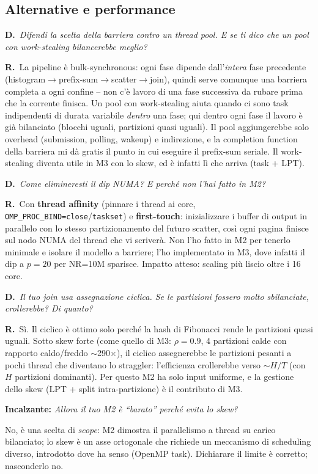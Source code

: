 \documentclass[11pt,a4paper]{article}
\newcommand{\D}[1]{\begin{dom}\small\textbf{D.}\ \itshape #1\end{dom}}
\newcommand{\R}{\noindent\textbf{R.}\ }
\newcommand{\Inc}[1]{\par\smallskip\noindent\textbf{\textcolor{red!55!black}{Incalzante:}} \textit{#1}\ \par}
\begin{document}
\subsection{Alternative e performance}

\D{Difendi la scelta della barriera contro un thread pool. E se ti dico che un pool con work-stealing bilancerebbe meglio?}
\R La pipeline è bulk-synchronous: ogni fase dipende dall'\emph{intera} fase precedente (histogram$\to$prefix-sum$\to$scatter$\to$join), quindi serve comunque una barriera completa a ogni confine -- non c'è lavoro di una fase successiva da rubare prima che la corrente finisca. Un pool con work-stealing aiuta quando ci sono task indipendenti di durata variabile \emph{dentro} una fase; qui dentro ogni fase il lavoro è già bilanciato (blocchi uguali, partizioni quasi uguali). Il pool aggiungerebbe solo overhead (submission, polling, wakeup) e indirezione, e la completion function della barriera mi dà gratis il punto in cui eseguire il prefix-sum seriale. Il work-stealing diventa utile in M3 con lo skew, ed è infatti lì che arriva (task + LPT).

\D{Come elimineresti il dip NUMA? E perché non l'hai fatto in M2?}
\R Con \textbf{thread affinity} (pinnare i thread ai core, \texttt{OMP\_PROC\_BIND=close}/\texttt{taskset}) e \textbf{first-touch}: inizializzare i buffer di output in parallelo con lo stesso partizionamento del futuro scatter, così ogni pagina finisce sul nodo NUMA del thread che vi scriverà. Non l'ho fatto in M2 per tenerlo minimale e isolare il modello a barriere; l'ho implementato in M3, dove infatti il dip a $p=20$ per NR=10M sparisce. Impatto atteso: scaling più liscio oltre i 16 core.

\D{Il tuo join usa assegnazione ciclica. Se le partizioni fossero molto sbilanciate, crollerebbe? Di quanto?}
\R Sì. Il ciclico è ottimo solo perché la hash di Fibonacci rende le partizioni quasi uguali. Sotto skew forte (come quello di M3: $\rho=0.9$, 4 partizioni calde con rapporto caldo/freddo $\sim$290$\times$), il ciclico assegnerebbe le partizioni pesanti a pochi thread che diventano lo straggler: l'efficienza crollerebbe verso $\sim H/T$ (con $H$ partizioni dominanti). Per questo M2 ha solo input uniforme, e la gestione dello skew (LPT + split intra-partizione) è il contributo di M3.
\Inc{Allora il tuo M2 è ``barato'' perché evita lo skew?} No, è una scelta di \emph{scope}: M2 dimostra il parallelismo a thread su carico bilanciato; lo skew è un asse ortogonale che richiede un meccanismo di scheduling diverso, introdotto dove ha senso (OpenMP task). Dichiarare il limite è corretto; nasconderlo no.
\end{document}
